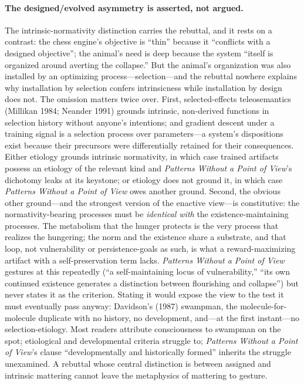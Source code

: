 \documentclass[11pt]{article}
\newcommand{\PP}{\emph{Patterns Without a Point of View}}
\begin{document}
\paragraph{The designed/evolved asymmetry is asserted, not argued.} The intrinsic-normativity distinction carries the rebuttal, and it rests on a contrast: the chess engine's objective is ``thin'' because it ``conflicts with a designed objective''; the animal's need is deep because the system ``itself is organized around averting the collapse.'' But the animal's organization was also installed by an optimizing process---selection---and the rebuttal nowhere explains why installation by selection confers intrinsicness while installation by design does not. The omission matters twice over. First, selected-effects teleosemantics (Millikan 1984; Neander 1991) grounds intrinsic, non-derived functions in selection history without anyone's intentions; and gradient descent under a training signal is a selection process over parameters---a system's dispositions exist because their precursors were differentially retained for their consequences. Either etiology grounds intrinsic normativity, in which case trained artifacts possess an etiology of the relevant kind and \PP{}'s dichotomy leaks at its keystone; or etiology does not ground it, in which case \PP{} owes another ground. Second, the obvious other ground---and the strongest version of the enactive view---is constitutive: the normativity-bearing processes must be \emph{identical with} the existence-maintaining processes. The metabolism that the hunger protects is the very process that realizes the hungering; the norm and the existence share a substrate, and that loop, not vulnerability or persistence-goals as such, is what a reward-maximizing artifact with a self-preservation term lacks. \PP{} gestures at this repeatedly (``a self-maintaining locus of vulnerability,'' ``its own continued existence generates a distinction between flourishing and collapse'') but never states it as the criterion. Stating it would expose the view to the test it must eventually pass anyway: Davidson's (1987) swampman, the molecule-for-molecule duplicate with no history, no development, and---at the first instant---no selection-etiology. Most readers attribute consciousness to swampman on the spot; etiological and developmental criteria struggle to; \PP{}'s clause ``developmentally and historically formed'' inherits the struggle unexamined. A rebuttal whose central distinction is between assigned and intrinsic mattering cannot leave the metaphysics of mattering to gesture.
\end{document}

